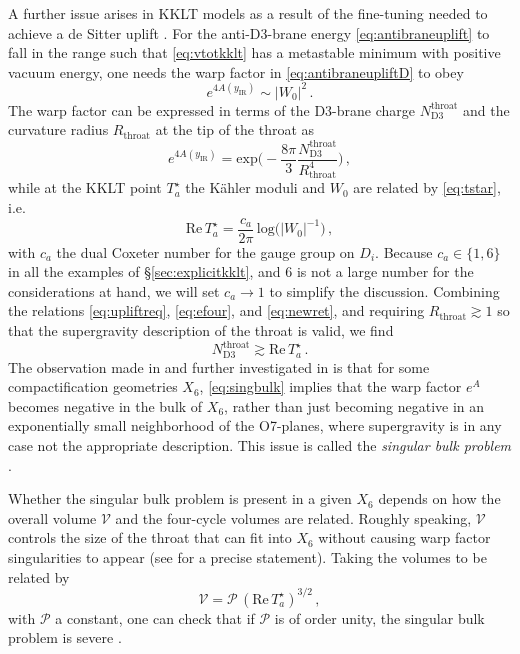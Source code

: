 \documentclass[12pt,a4wide]{article}
\begin{document}
A further issue arises in KKLT models as a result of the fine-tuning needed to achieve a de Sitter uplift \cite{Carta:2019rhx,Gao:2020xqh}.
For the anti-D3-brane energy  \eqref{eq:antibraneuplift} to fall in the range such that
\eqref{eq:vtotkklt} has a metastable minimum with positive vacuum energy, one needs the warp factor in \eqref{eq:antibraneupliftD} to obey
\begin{equation}\label{eq:upliftreq}
e^{4A(y_{\text{IR}})} \sim |W_0|^2\,.
\end{equation}
The warp factor can be expressed in terms of the D3-brane charge $N_{\text{D3}}^{\text{throat}}$ and the curvature radius $R_{\text{throat}}$ at the tip of the throat as \cite{Giddings:2001yu}
\begin{equation}\label{eq:efour}
    e^{4A(y_{\text{IR}})} = \text{exp}\Biggl(-\frac{8\pi}{3} \frac{N_{\text{D3}}^{\text{throat}}}{R_{\text{throat}}^4}\Biggr)\,,
\end{equation}
while at the KKLT point $T_a^{\star}$ the K\"ahler moduli and $W_0$ are related by \eqref{eq:tstar}, i.e.~
\begin{equation}\label{eq:newret}
\text{Re}\,T_a^\star = \frac{c_a}{2\pi}\,\text{log}\bigl(|W_0|^{-1}\bigr)\,,
\end{equation}
with $c_a$ the dual Coxeter number for the gauge group on $D_i$.  Because $c_a \in \{1,6\}$ in all the examples of \S\ref{sec:explicitkklt}, and $6$ is not a large number for the considerations at hand, we will set $c_a \to 1$ to simplify the discussion.
Combining the relations \eqref{eq:upliftreq}, \eqref{eq:efour}, and \eqref{eq:newret}, and requiring $R_{\text{throat}} \gtrsim 1$ so that the supergravity description of the throat is valid, we find
\begin{equation}\label{eq:singbulk}
N_{\text{D3}}^{\text{throat}} \gtrsim \text{Re}\,T_a^\star\,.
\end{equation}
The observation made in \cite{Carta:2019rhx} and further investigated in \cite{Gao:2020xqh} is that for some compactification geometries $X_6$, \eqref{eq:singbulk} implies that the warp factor $e^{A}$ becomes negative in the bulk of $X_6$, rather than just becoming negative in an exponentially small neighborhood of the O7-planes, where supergravity is in any case not the appropriate description.  This issue is called the \emph{singular bulk problem} \cite{Gao:2020xqh}.

Whether the singular bulk problem is present in a given $X_6$ depends on how the overall volume $\mathcal{V}$ and the four-cycle volumes are related.  Roughly speaking, $\mathcal{V}$ controls the size of the throat that can fit into $X_6$ without causing warp factor singularities to appear (see \cite{Carta:2019rhx,Gao:2020xqh,Carta:2021lqg} for a precise statement).
Taking the volumes to be related by
\begin{equation}\label{eq:vnaive}
    \mathcal{V} = \mathcal{P}\,(\text{Re}\,T_a^\star)^{3/2}\,,
\end{equation} with $\mathcal{P}$ a constant,
one can check that if  $\mathcal{P}$ is
of order unity, the singular bulk problem is severe \cite{Carta:2019rhx,Gao:2020xqh}.
\end{document}
